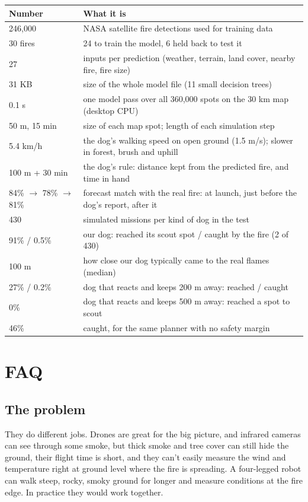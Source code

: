 \documentclass[11pt]{article}
\newcommand{\q}[1]{\par\medskip{\bfseries #1}\par\nopagebreak}
\begin{document}
\begin{tabularx}{\linewidth}{@{}lX@{}}
\toprule
\textbf{Number} & \textbf{What it is} \\
\midrule
246,000 & NASA satellite fire detections used for training data \\
30 fires & 24 to train the model, 6 held back to test it \\
27 & inputs per prediction (weather, terrain, land cover, nearby fire, fire size) \\
31 KB & size of the whole model file (11 small decision trees) \\
0.1 s & one model pass over all 360,000 spots on the 30 km map (desktop CPU) \\
50 m, 15 min & size of each map spot; length of each simulation step \\
5.4 km/h & the dog's walking speed on open ground (1.5 m/s); slower in forest, brush and uphill \\
100 m + 30 min & the dog's rule: distance kept from the predicted fire, and time in hand \\
84\% $\rightarrow$ 78\% $\rightarrow$ 81\% & forecast match with the real fire: at launch, just before the dog's report, after it \\
430 & simulated missions per kind of dog in the test \\
91\% / 0.5\% & our dog: reached its scout spot / caught by the fire (2 of 430) \\
100 m & how close our dog typically came to the real flames (median) \\
27\% / 0.2\% & dog that reacts and keeps 200 m away: reached / caught \\
0\% & dog that reacts and keeps 500 m away: reached a spot to scout \\
46\% & caught, for the same planner with no safety margin \\
\bottomrule
\end{tabularx}

\section{FAQ}

\subsection{The problem}

\q{Why a robot dog and not a drone?}
They do different jobs. Drones are great for the big picture, and infrared cameras can see through some smoke, but thick smoke and tree cover can still hide the ground, their flight time is short, and they can't easily measure the wind and temperature right at ground level where the fire is spreading. A four-legged robot can walk steep, rocky, smoky ground for longer and measure conditions at the fire edge. In practice they would work together.
\end{document}
